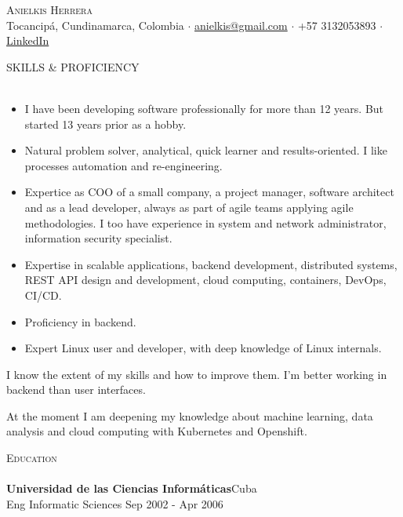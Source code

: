 \documentclass[a4paper]{article}
\newcommand{\lineunder} {
    \vspace*{-8pt} \\
    \hspace*{-18pt} \hrulefill \\
}
\newcommand{\header} [1] {
    {\hspace*{-18pt}\vspace*{6pt} \textsc{#1}}
    \vspace*{-6pt} \lineunder
}
\begin{document}
\vspace*{-40pt}

\vspace*{-10pt}
\begin{center}
 {\Huge \scshape {Anielkis Herrera}}\\
 Tocancipá, Cundinamarca, Colombia $\cdot$ \href{mailto:anielkis@gmail.com}{anielkis@gmail.com} $\cdot$ +57 3132053893 $\cdot$ \href{https://www.linkedin.com/in/anielkis-herrera-170aa167/}{LinkedIn}\\
\end{center}

\header{SKILLS \& PROFICIENCY}

\begin{itemize}
 \item I have been developing software professionally for more than 12 years. But started 13 years prior as a hobby.
 \item Natural problem solver, analytical, quick learner	and results-oriented. I like processes automation and re-engineering.
 \item Expertice as COO of a small company, a project manager, software architect and as a lead developer, always as part of agile teams applying agile methodologies. I too have experience in system and network administrator, information security specialist.
 \item Expertise in scalable applications, backend development, distributed systems, REST API design and development, cloud computing, containers, DevOps, CI/CD.
 \item Proficiency in backend.
 \item Expert Linux user and developer, with deep knowledge of Linux internals.
\end{itemize}

I know the extent of my skills and how to improve them. I'm better working in backend than user interfaces.

At the moment I am deepening my knowledge about machine learning, data analysis and cloud computing with Kubernetes and Openshift.

\vspace{2mm}

\header{Education}
\textbf{Universidad de las Ciencias Informáticas}\hfill Cuba\\
Eng Informatic Sciences \hfill Sep 2002 - Apr 2006\\
\vspace{2mm}
\end{document}

